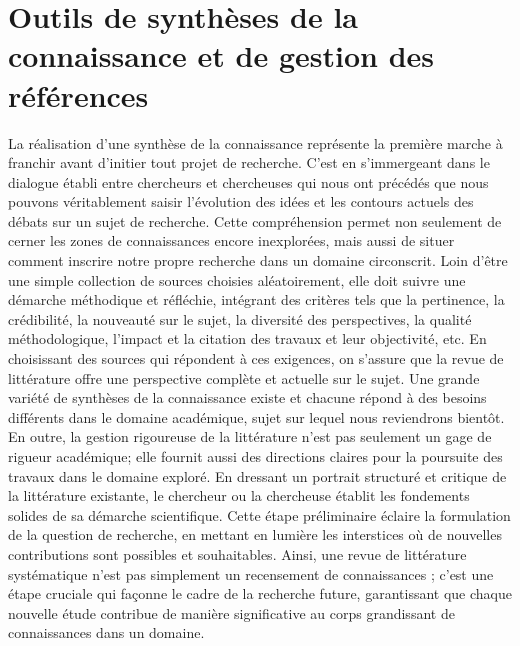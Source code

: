 \documentclass[
  letterpaper,
  DIV=11,
  numbers=noendperiod]{scrreprt}
\begin{document}

\hypertarget{sec-chap4}{%
\chapter{Outils de synthèses de la connaissance et de gestion des
références}\label{sec-chap4}}

La réalisation d'une synthèse de la connaissance représente la première
marche à franchir avant d'initier tout projet de recherche. C'est en
s'immergeant dans le dialogue établi entre chercheurs et chercheuses qui
nous ont précédés que nous pouvons véritablement saisir l'évolution des
idées et les contours actuels des débats sur un sujet de recherche.
Cette compréhension permet non seulement de cerner les zones de
connaissances encore inexplorées, mais aussi de situer comment inscrire
notre propre recherche dans un domaine circonscrit. Loin d'être une
simple collection de sources choisies aléatoirement, elle doit suivre
une démarche méthodique et réfléchie, intégrant des critères tels que la
pertinence, la crédibilité, la nouveauté sur le sujet, la diversité des
perspectives, la qualité méthodologique, l'impact et la citation des
travaux et leur objectivité, etc. En choisissant des sources qui
répondent à ces exigences, on s'assure que la revue de littérature offre
une perspective complète et actuelle sur le sujet. Une grande variété de
synthèses de la connaissance existe et chacune répond à des besoins
différents dans le domaine académique, sujet sur lequel nous reviendrons
bientôt. En outre, la gestion rigoureuse de la littérature n'est pas
seulement un gage de rigueur académique; elle fournit aussi des
directions claires pour la poursuite des travaux dans le domaine
exploré. En dressant un portrait structuré et critique de la littérature
existante, le chercheur ou la chercheuse établit les fondements solides
de sa démarche scientifique. Cette étape préliminaire éclaire la
formulation de la question de recherche, en mettant en lumière les
interstices où de nouvelles contributions sont possibles et
souhaitables. Ainsi, une revue de littérature systématique n'est pas
simplement un recensement de connaissances ; c'est une étape cruciale
qui façonne le cadre de la recherche future, garantissant que chaque
nouvelle étude contribue de manière significative au corps grandissant
de connaissances dans un domaine.
\end{document}
